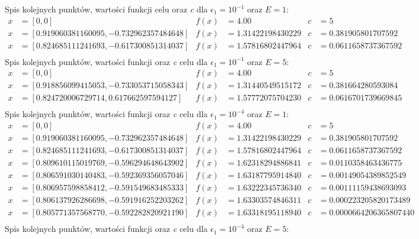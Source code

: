 \documentclass[a4paper,12pt]{article}
\begin{document}
Spis kolejnych punktów, wartości funkcji celu oraz \textit{c}  dla $\epsilon_{1} = 10^{-1}$ oraz $E = 1$:
\begin{align*}
x &= [0, 0] & 
f(x) &= 4.00 &
c &= 5 \\
x &= [0.919060381160095, -0.732962357484648] & 
f(x) &= 1.31422198430229 &
c &= 0.381905801707592 \\
x &= [0.824685111241693, -0.617300851314037] & 
f(x) &= 1.57816802447964 &
c &= 0.0611658737367592 \\
\end{align*}
Spis kolejnych punktów, wartości funkcji oraz \textit{c} celu dla $\epsilon_{1} = 10^{-1}$ oraz $E = 5$:
\begin{align*}
x &= [0, 0] & 
f(x) &= 4.00 &
c &= 5 \\
x &= [0.918856099415053, -0.733053715058343] & 
f(x) &= 1.31440549515172 &
c &= 0.381664280593084 \\
x &= [0.824720006729714, 0.617662597594127] & 
f(x) &= 1.57772075704230 &
c &= 0.0616701739669845 \\
\end{align*}
Spis kolejnych punktów, wartości funkcji oraz \textit{c} celu dla $\epsilon_{1} = 10^{-4}$ oraz $E = 1$:
\begin{align*}
x &= [0, 0] & 
f(x) &= 4.00 &
c &= 5 \\
x &= [0.919060381160095, -0.732962357484648] & 
f(x) &= 1.31422198430229 &
c &= 0.381905801707592 \\
x &= [0.824685111241693, -0.617300851314037] & 
f(x) &= 1.57816802447964 &
c &= 0.0611658737367592 \\
x &= [0.809610115019769, -0.596294648643902] & 
f(x) &= 1.62318294886841 &
c &= 0.0110358463436775 \\
x &= [0.806591030140483, -0.592369356057046] & 
f(x) &= 1.63187795914840 &
c &= 0.00149054389852549 \\
x &= [0.806957598858412, -0.591549683485333] & 
f(x) &= 1.63222345736340 &
c &= 0.00111159438693093 \\
x &= [0.806137926286698, -0.591916252203262] & 
f(x) &= 1.63303574846311 &
c &= 0.000223205820173489 \\
x &= [0.805771357568770, -0.592282820921190] & 
f(x) &= 1.63318195118940 &
c &= 0.0000664206365807440 \\
\end{align*}
Spis kolejnych punktów, wartości funkcji oraz \textit{c} celu dla $\epsilon_{1} = 10^{-4}$ oraz $E = 5$:
\end{document}
